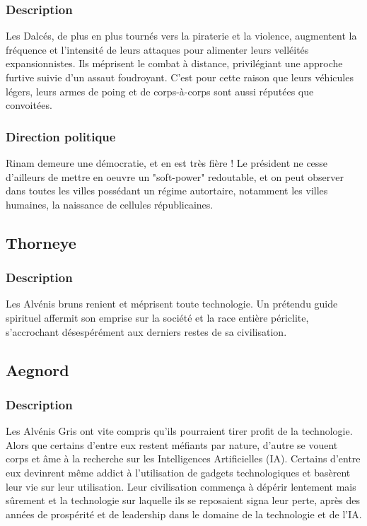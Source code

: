 \subsubsection{Description}
Les Dalcés, de plus en plus tournés vers la piraterie et la violence, augmentent la fréquence et l'intensité de leurs attaques pour alimenter leurs velléités expansionnistes. Ils méprisent le combat à distance, privilégiant une approche furtive suivie d'un assaut foudroyant. C'est pour cette raison que leurs véhicules légers, leurs armes de poing et de corps-à-corps sont aussi réputées que convoitées.
\subsubsection{Direction politique}
Rinam demeure une démocratie, et en est très fière ! Le président ne cesse d'ailleurs de mettre en oeuvre un "soft-power" redoutable, et on peut observer dans toutes les villes possédant un régime autortaire, notamment les villes humaines, la naissance de cellules républicaines.
\subsection{Thorneye}
\subsubsection{Description}
Les Alvénis bruns renient et méprisent toute technologie. Un prétendu guide spirituel affermit son emprise sur la société et la race entière périclite, s'accrochant désespérément aux derniers restes de sa civilisation.
\subsection{Aegnord} 
\subsubsection{Description}
Les Alvénis Gris ont vite compris qu'ils pourraient tirer profit de la technologie. Alors que certains d'entre eux restent méfiants par nature, d'autre se vouent corps et âme à la recherche sur les Intelligences Artificielles (IA). Certains d'entre eux devinrent même addict à l'utilisation de gadgets technologiques et basèrent leur vie sur leur utilisation. Leur civilisation commença à dépérir lentement mais sûrement et la technologie sur laquelle ils se reposaient signa leur perte, après des années de prospérité et de leadership dans le domaine de la technologie et de l'IA.
